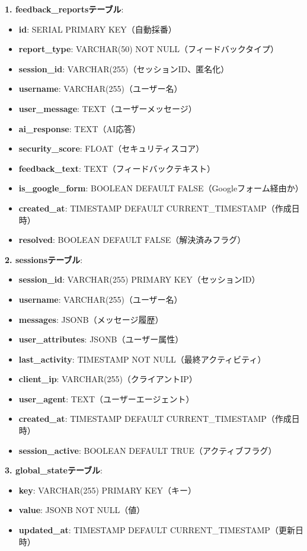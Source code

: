 \documentclass[a4paper,11pt,ja=standard,xelatex]{bxjsarticle}
\theoremstyle{definition}
\begin{document}
\textbf{1. feedback\_reportsテーブル}:
\begin{itemize}
\item \textbf{id}: SERIAL PRIMARY KEY（自動採番）
\item \textbf{report\_type}: VARCHAR(50) NOT NULL（フィードバックタイプ）
\item \textbf{session\_id}: VARCHAR(255)（セッションID、匿名化）
\item \textbf{username}: VARCHAR(255)（ユーザー名）
\item \textbf{user\_message}: TEXT（ユーザーメッセージ）
\item \textbf{ai\_response}: TEXT（AI応答）
\item \textbf{security\_score}: FLOAT（セキュリティスコア）
\item \textbf{feedback\_text}: TEXT（フィードバックテキスト）
\item \textbf{is\_google\_form}: BOOLEAN DEFAULT FALSE（Googleフォーム経由か）
\item \textbf{created\_at}: TIMESTAMP DEFAULT CURRENT\_TIMESTAMP（作成日時）
\item \textbf{resolved}: BOOLEAN DEFAULT FALSE（解決済みフラグ）
\end{itemize}

\textbf{2. sessionsテーブル}:
\begin{itemize}
\item \textbf{session\_id}: VARCHAR(255) PRIMARY KEY（セッションID）
\item \textbf{username}: VARCHAR(255)（ユーザー名）
\item \textbf{messages}: JSONB（メッセージ履歴）
\item \textbf{user\_attributes}: JSONB（ユーザー属性）
\item \textbf{last\_activity}: TIMESTAMP NOT NULL（最終アクティビティ）
\item \textbf{client\_ip}: VARCHAR(255)（クライアントIP）
\item \textbf{user\_agent}: TEXT（ユーザーエージェント）
\item \textbf{created\_at}: TIMESTAMP DEFAULT CURRENT\_TIMESTAMP（作成日時）
\item \textbf{session\_active}: BOOLEAN DEFAULT TRUE（アクティブフラグ）
\end{itemize}

\textbf{3. global\_stateテーブル}:
\begin{itemize}
\item \textbf{key}: VARCHAR(255) PRIMARY KEY（キー）
\item \textbf{value}: JSONB NOT NULL（値）
\item \textbf{updated\_at}: TIMESTAMP DEFAULT CURRENT\_TIMESTAMP（更新日時）
\end{itemize}
\end{document}
